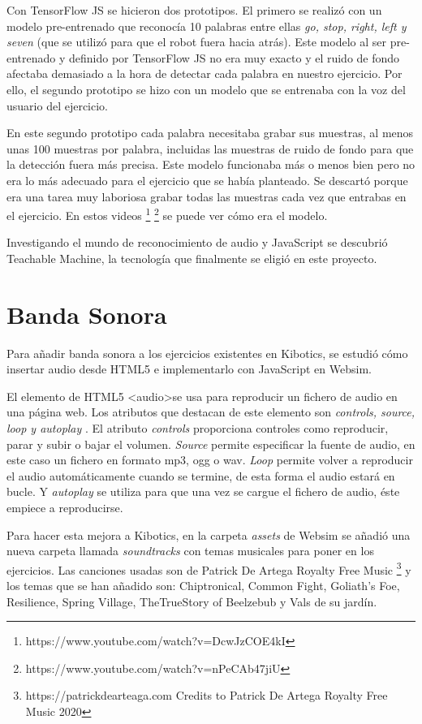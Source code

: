 Con TensorFlow JS se hicieron dos prototipos. El primero se realizó con un modelo pre-entrenado que reconocía 10 palabras entre ellas \textit{go, stop, right, left y seven} (que se utilizó para que el robot fuera hacia atrás).
Este modelo al ser pre-entrenado y definido por TensorFlow JS no era muy exacto y el ruido de fondo afectaba demasiado a la hora de detectar cada palabra en nuestro ejercicio. Por ello, el segundo prototipo se hizo con un modelo que se entrenaba con la voz del usuario del ejercicio.

En este segundo prototipo cada palabra necesitaba grabar sus muestras, al menos unas 100 muestras por palabra, incluidas las muestras de ruido de fondo para que la detección fuera más precisa. Este modelo funcionaba más o menos bien pero no era lo más adecuado para el ejercicio que se había planteado. Se descartó porque era una tarea muy laboriosa grabar todas las muestras cada vez que entrabas en el ejercicio. 
En estos videos \footnote{https://www.youtube.com/watch?v=DcwJzCOE4kI}
\footnote{https://www.youtube.com/watch?v=nPeCAb47jiU} se puede ver cómo era el modelo.

Investigando el mundo de reconocimiento de audio y JavaScript se descubrió Teachable Machine, la tecnología que finalmente se eligió en este proyecto.


\section{Banda Sonora}

Para añadir banda sonora a los ejercicios existentes en Kibotics, se estudió cómo insertar audio desde HTML5 e implementarlo con JavaScript en Websim.

El elemento de HTML5 \textless audio\textgreater  se usa para reproducir un fichero de audio en una página web.
Los atributos que destacan de este elemento son \textit{controls, source, loop y autoplay }.
El atributo \textit{controls} proporciona controles como reproducir, parar y subir o bajar el volumen.
 \textit{Source} permite especificar la fuente de audio, en este caso un fichero en formato mp3, ogg o wav. \textit{Loop} permite volver a reproducir el audio automáticamente cuando se termine, de esta forma  el audio estará en bucle. Y \textit{autoplay} se utiliza para que una vez se cargue el fichero de audio, éste empiece a reproducirse.

Para hacer esta mejora a Kibotics, en la carpeta \textit{assets} de Websim se añadió una nueva carpeta llamada \textit{soundtracks} con temas musicales para poner en los ejercicios. Las canciones usadas son de Patrick De Artega Royalty Free Music  \footnote{ https://patrickdearteaga.com Credits to Patrick De Artega Royalty Free Music 2020}
y los temas que se han añadido son:
Chiptronical, Common Fight, Goliath's Foe, Resilience, Spring Village, TheTrueStory of Beelzebub y Vals de su jardín.


